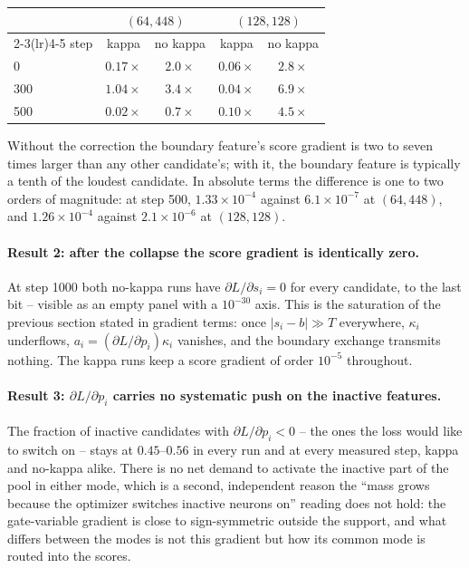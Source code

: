 \documentclass[11pt,a4paper]{article}
\begin{document}
\begin{center}\small
\begin{tabular}{lcccc}
\toprule
 & \multicolumn{2}{c}{$(64,448)$} & \multicolumn{2}{c}{$(128,128)$} \\
\cmidrule(lr){2-3}\cmidrule(lr){4-5}
step & kappa & no kappa & kappa & no kappa \\
\midrule
0   & $0.17\times$ & $2.0\times$ & $0.06\times$ & $2.8\times$ \\
300 & $1.04\times$ & $3.4\times$ & $0.04\times$ & $6.9\times$ \\
500 & $0.02\times$ & $0.7\times$ & $0.10\times$ & $4.5\times$ \\
\bottomrule
\end{tabular}
\end{center}

Without the correction the boundary feature's score gradient is two to seven
times larger than any other candidate's; with it, the boundary feature is
typically a tenth of the loudest candidate. In absolute terms the difference
is one to two orders of magnitude: at step 500, $1.33\times10^{-4}$ against
$6.1\times10^{-7}$ at $(64,448)$, and $1.26\times10^{-4}$ against
$2.1\times10^{-6}$ at $(128,128)$.

\paragraph{Result 2: after the collapse the score gradient is identically
zero.}
At step 1000 both no-kappa runs have $\partial L/\partial s_i = 0$ for every
candidate, to the last bit -- visible as an empty panel with a $10^{-30}$
axis. This is the saturation of the previous section stated in gradient
terms: once $|s_i - b| \gg T$ everywhere, $\kappa_i$ underflows, $a_i =
(\partial L/\partial p_i)\kappa_i$ vanishes, and the boundary exchange
transmits nothing. The kappa runs keep a score gradient of order
$10^{-5}$ throughout.

\paragraph{Result 3: $\partial L/\partial p_i$ carries no systematic push on
the inactive features.}
The fraction of inactive candidates with $\partial L/\partial p_i < 0$ -- the
ones the loss would like to switch on -- stays at $0.45$--$0.56$ in every run
and at every measured step, kappa and no-kappa alike. There is no net demand
to activate the inactive part of the pool in either mode, which is a second,
independent reason the ``mass grows because the optimizer switches inactive
neurons on'' reading does not hold: the gate-variable gradient is close to
sign-symmetric outside the support, and what differs between the modes is not
this gradient but how its common mode is routed into the scores.
\end{document}
